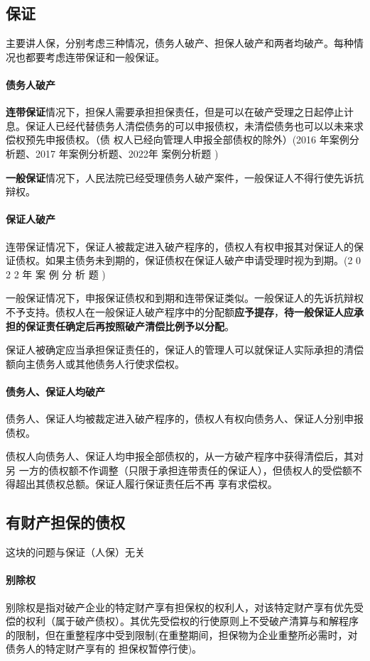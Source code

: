 \documentclass[UTF8,12pt]{ctexart}
\numberwithin{equation}{section} %
\numberwithin{figure}{section}
\numberwithin{table}{section}
\begin{document}
	
	\subsection{保证}
	主要讲人保，分别考虑三种情况，债务人破产、担保人破产和两者均破产。每种情况也都要考虑连带保证和一般保证。
	
	\paragraph{债务人破产}
	\textbf{连带保证}情况下，担保人需要承担担保责任，但是可以在破产受理之日起停止计息。保证人已经代替债务人清偿债务的可以申报债权，未清偿债务也可以以未来求偿权预先申报债权。（债 权人已经向管理人申报全部债权的除外）(2016 年案例分析题、2017 年案例分析题、2022年 案例分析题 )
	
	\textbf{一般保证}情况下，人民法院已经受理债务人破产案件，一般保证人不得行使先诉抗辩权。
	
	\paragraph{保证人破产}
	连带保证情况下，保证人被裁定进入破产程序的，债权人有权申报其对保证人的保证债权。如果主债务未到期的，保证债权在保证人破产申请受理时视为到期。(2 0 2 2 年 案 例 分 析 题 )

	一般保证情况下，申报保证债权和到期和连带保证类似。一般保证人的先诉抗辩权不予支持。债权人在一般保证人破产程序中的分配额\textbf{应予提存}，\textbf{待一般保证人应承担的保证责任确定后再按照破产清偿比例予以分配}。
	
	保证人被确定应当承担保证责任的，保证人的管理人可以就保证人实际承担的清偿额向主债务人或其他债务人行使求偿权。
	
	\paragraph{债务人、保证人均破产}
	债务人、保证人均被裁定进入破产程序的，债权人有权向债务人、保证人分别申报债权。 
	
	债权人向债务人、保证人均申报全部债权的，从一方破产程序中获得清偿后，其对另 一方的债权额不作调整（只限于承担连带责任的保证人），但债权人的受偿额不得超出其债权总额。保证人履行保证责任后不再 享有求偿权。
	
	
	\subsection{有财产担保的债权}
	这块的问题与保证（人保）无关
	\paragraph{别除权}
	别除权是指对破产企业的特定财产享有担保权的权利人，对该特定财产享有优先受偿的权利（属于破产债权）。其优先受偿权的行使原则上不受破产清算与和解程序的限制，但在重整程序中受到限制(在重整期间，担保物为企业重整所必需时，对债务人的特定财产享有的 担保权暂停行使)。
	
\end{document}
